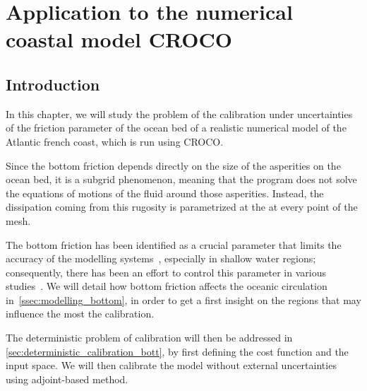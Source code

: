 \documentclass[../../Main_ManuscritThese.tex]{subfiles}
\newcommand{\CROCO}{CROCO}
\begin{document}
\chapter{Application to the numerical coastal model \CROCO}
\label{chap:croco}
\minitoc
\subfileLocal{\pagestyle{contentStyle}}

\section{Introduction}
\label{sec:intro_croco}


In this chapter, we will study the problem of the calibration under
uncertainties of the friction parameter of the ocean bed of a realistic
numerical model of the Atlantic french coast, which is run using \CROCO. 

Since the bottom friction depends directly on the size of the
asperities on the ocean bed, it is a subgrid phenomenon, meaning that
the program does not solve the equations of motions of the fluid
around those asperities. Instead, the dissipation coming from this
rugosity is parametrized at the at every point of the mesh.

The bottom friction has been identified as a crucial
parameter that limits the accuracy of the modelling
systems~\cite{sinha_principal_1997,kreitmair_effect_2019}, especially in shallow water
regions; consequently, there has been an effort to control this
parameter in various
studies~\cite{das_variational_1992,das_estimation_1991,boutet_estimation_2015}.
We will detail how bottom friction affects the oceanic circulation
in~\cref{ssec:modelling_bottom}, in order to get a first insight on
the regions that may influence the most the calibration.

The deterministic problem of calibration will then be addressed in
\cref{sec:deterministic_calibration_bott}, by first defining the cost
function and the input space. We will then calibrate the model
without external uncertainties using adjoint-based method.
\end{document}
